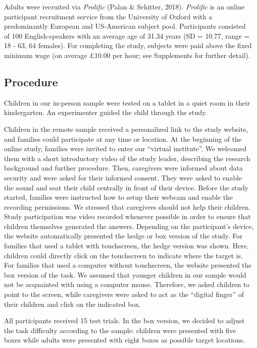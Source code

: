 \documentclass[
  man,floatsintext]{apa6}
\begin{document}
Adults were recruited via \emph{Prolific} (Palan \& Schitter, 2018).
\emph{Prolific} is an online participant recruitment service from the University of Oxford with a predominantly European and US-American subject pool.
Participants consisted of 100 English-speakers with an average age of 31.34 years (SD = 10.77, range = 18 - 63, 64 females).
For completing the study, subjects were paid above the fixed minimum wage (on average £10.00 per hour; see Supplements for further detail).

\hypertarget{procedure}{%
\subsection{Procedure}\label{procedure}}

Children in our in-person sample were tested on a tablet in a quiet room in their kindergarten.
An experimenter guided the child through the study.

Children in the remote sample received a personalized link to the study website, and families could participate at any time or location.
At the beginning of the online study, families were invited to enter our ``virtual institute''.
We welcomed them with a short introductory video of the study leader, describing the research background and further procedure.
Then, caregivers were informed about data security and were asked for their informed consent.
They were asked to enable the sound and seat their child centrally in front of their device.
Before the study started, families were instructed how to setup their webcam and enable the recording permissions.
We stressed that caregivers should not help their children.
Study participation was video recorded whenever possible in order to ensure that children themselves generated the answers.
Depending on the participant's device, the website automatically presented the hedge or box version of the study.
For families that used a tablet with touchscreen, the hedge version was shown.
Here, children could directly click on the touchscreen to indicate where the target is.
For families that used a computer without touchscreen, the website presented the box version of the task.
We assumed that younger children in our sample would not be acquainted with using a computer mouse.
Therefore, we asked children to point to the screen, while caregivers were asked to act as the ``digital finger'' of their children and click on the indicated box.

All participants received 15 test trials.
In the box version, we decided to adjust the task difficulty according to the sample: children were presented with five boxes while adults were presented with eight boxes as possible target locations.
\end{document}
